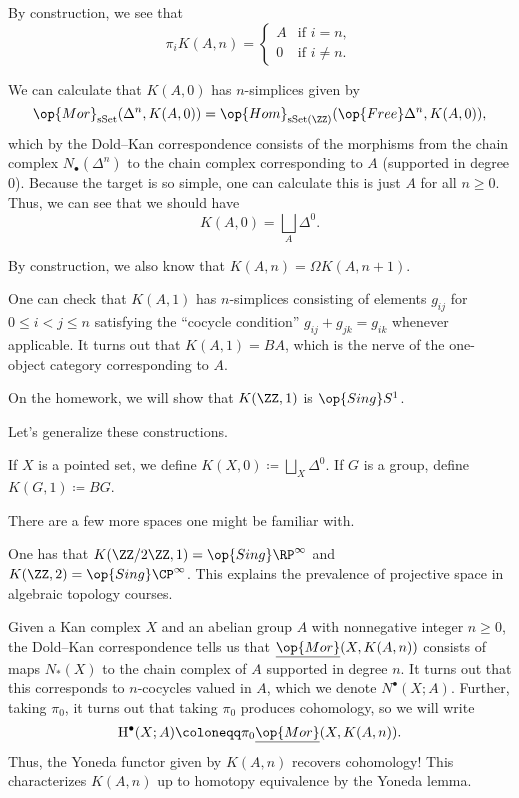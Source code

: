 \documentclass[../notes.tex]{subfiles}
\begin{document}
\begin{remark}
	By construction, we see that
	\[\pi_iK(A,n)=\begin{cases}
		A & \text{if }i=n, \\
		0 & \text{if }i\ne n.
	\end{cases}\]
\end{remark}
\begin{example}
	We can calculate that $K(A,0)$ has $n$-simplices given by
	\[\op{Mor}_{\mathrm{sSet}}(\Delta^n,K(A,0))=\op{Hom}_{\mathrm{sSet}(\ZZ)}(\op{Free}\Delta^n,K(A,0)),\]
	which by the Dold--Kan correspondence consists of the morphisms from the chain complex $N_\bullet(\Delta^n)$ to the chain complex corresponding to $A$ (supported in degree $0$). Because the target is so simple, one can calculate this is just $A$ for all $n\ge0$. Thus, we can see that we should have
	\[K(A,0)=\bigsqcup_A\Delta^0.\]
\end{example}
\begin{example}
	By construction, we also know that $K(A,n)=\Omega K(A,n+1)$.
\end{example}
\begin{example}
	One can check that $K(A,1)$ has $n$-simplices consisting of elements $g_{ij}$ for $0\le i<j\le n$ satisfying the ``cocycle condition'' $g_{ij}+g_{jk}=g_{ik}$ whenever applicable. It turns out that $K(A,1)=BA$, which is the nerve of the one-object category corresponding to $A$.
\end{example}
\begin{example}
	On the homework, we will show that $K(\ZZ,1)$ is $\op{Sing}S^1$.
\end{example}
Let's generalize these constructions.
\begin{notation}
	If $X$ is a pointed set, we define $K(X,0)\coloneqq\bigsqcup_X\Delta^0$. If $G$ is a group, define $K(G,1)\coloneqq BG$.
\end{notation}
There are a few more spaces one might be familiar with.
\begin{example}
	One has that $K(\ZZ/2\ZZ,1)=\op{Sing}\RP^\infty$ and $K(\ZZ,2)=\op{Sing}\CP^\infty$. This explains the prevalence of projective space in algebraic topology courses.
\end{example}
\begin{remark}
	Given a Kan complex $X$ and an abelian group $A$ with nonnegative integer $n\ge0$, the Dold--Kan correspondence tells us that $\underline{\op{Mor}}(X,K(A,n))$ consists of maps $N_*(X)$ to the chain complex of $A$ supported in degree $n$. It turns out that this corresponds to $n$-cocycles valued in $A$, which we denote $N^\bullet(X;A)$. Further, taking $\pi_0$, it turns out that taking $\pi_0$ produces cohomology, so we will write
	\[\mathrm H^\bullet(X;A)\coloneqq\pi_0\underline{\op{Mor}}(X,K(A,n)).\]
	Thus, the Yoneda functor given by $K(A,n)$ recovers cohomology! This characterizes $K(A,n)$ up to homotopy equivalence by the Yoneda lemma.
\end{remark}
\end{document}
